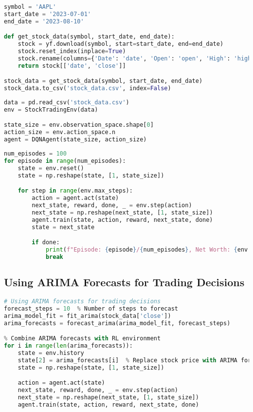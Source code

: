 \documentclass{article}
\begin{document}
\begin{lstlisting}[language=Python]
symbol = 'AAPL'
start_date = '2023-07-01'
end_date = '2023-08-10'

def get_stock_data(symbol, start_date, end_date):
    stock = yf.download(symbol, start=start_date, end=end_date)
    stock.reset_index(inplace=True)
    stock.rename(columns={'Date': 'date', 'Open': 'open', 'High': 'high', 'Low': 'low', 'Close': 'close', 'Volume': 'volume'}, inplace=True)
    return stock[['date', 'close']]

stock_data = get_stock_data(symbol, start_date, end_date)
stock_data.to_csv('stock_data.csv', index=False)
\end{lstlisting}

\begin{lstlisting}[language=Python]
data = pd.read_csv('stock_data.csv')
env = StockTradingEnv(data)

state_size = env.observation_space.shape[0]
action_size = env.action_space.n
agent = DQNAgent(state_size, action_size)
\end{lstlisting}

\begin{lstlisting}[language=Python]
num_episodes = 100
for episode in range(num_episodes):
    state = env.reset()
    state = np.reshape(state, [1, state_size])

    for step in range(env.max_steps):
        action = agent.act(state)
        next_state, reward, done, _ = env.step(action)
        next_state = np.reshape(next_state, [1, state_size])
        agent.train(state, action, reward, next_state, done)
        state = next_state

        if done:
            print(f"Episode: {episode}/{num_episodes}, Net Worth: {env.net_worth}")
            break
\end{lstlisting}

\subsection{Using ARIMA Forecasts for Trading Decisions}

\begin{lstlisting}[language=Python]
# Using ARIMA forecasts for trading decisions
forecast_steps = 10  % Number of steps to forecast
arima_model_fit = fit_arima(stock_data['close'])
arima_forecasts = forecast_arima(arima_model_fit, forecast_steps)

% Combine ARIMA forecasts with RL environment
for i in range(len(arima_forecasts)):
    state = env.history
    state[2] = arima_forecasts[i]  % Replace stock price with ARIMA forecast
    state = np.reshape(state, [1, state_size])

    action = agent.act(state)
    next_state, reward, done, _ = env.step(action)
    next_state = np.reshape(next_state, [1, state_size])
    agent.train(state, action, reward, next_state, done)
\end{lstlisting}
\end{document}
